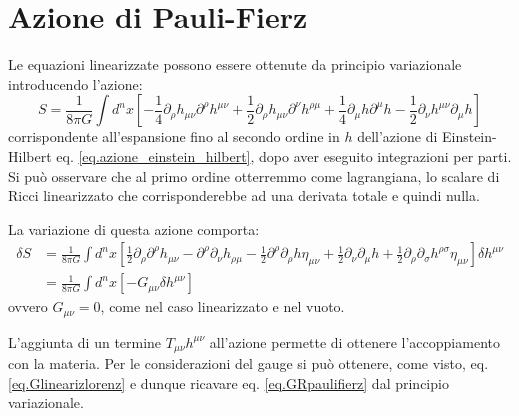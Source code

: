 \section{Azione di Pauli-Fierz}
Le equazioni linearizzate possono essere ottenute da principio variazionale introducendo l'azione:
\begin{equation}
    S = \frac{1}{8\pi G}\int d^n x \left[ - \frac{1}{4}\partial_\rho h_{\mu\nu} \partial^\rho h^{\mu\nu} + \frac{1}{2}\partial_\rho h_{\mu\nu} \partial^\nu h^{\rho\mu} +\frac{1}{4}\partial_\mu h\partial^\mu h - \frac{1}{2}\partial_\nu h^{\mu\nu} \partial_\mu h \right]
    \label{eq.azione_paulifierz}
\end{equation}
corrispondente all'espansione fino al secondo ordine in $h$ dell'azione di Einstein-Hilbert eq. \ref{eq.azione_einstein_hilbert}, dopo aver eseguito integrazioni per parti. Si può osservare che al primo ordine otterremmo come lagrangiana, lo scalare di Ricci linearizzato che corrisponderebbe ad una derivata totale e quindi nulla.

La variazione di questa azione comporta:
\begin{align*}
    \delta S &= \frac{1}{8\pi G} \int d^nx \left[ \frac{1}{2}\partial_\rho \partial^\rho h_{\mu\nu} - \partial^\rho \partial_\nu h_{\rho\mu} - \frac{1}{2}\partial^\rho \partial_\rho h \eta_{\mu\nu} + \frac{1}{2}\partial_\nu \partial_\mu h + \frac{1}{2}\partial_\rho \partial_\sigma h^{\rho\sigma} \eta_{\mu\nu}\right] \delta h^{\mu\nu} \\
    &= \frac{1}{8\pi G} \int d^n x [ - G_{\mu\nu} \delta h^{\mu\nu} ]
\end{align*}
ovvero $G_{\mu\nu} = 0$, come nel caso linearizzato e nel vuoto.

L'aggiunta di un termine $T_{\mu\nu}h^{\mu\nu}$ all'azione permette di ottenere l'accoppiamento con la materia. Per le considerazioni del gauge si può ottenere, come visto, eq. \ref{eq.Glinearizlorenz} e dunque ricavare eq. \ref{eq.GRpaulifierz} dal principio variazionale.

